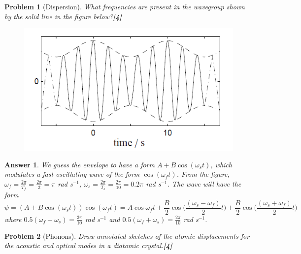\documentclass[a4paper]{article}
\newtheorem{ans}{Answer}[subsection]
\theoremstyle{new}
\newtheorem{qns}{Problem}[subsection]
\begin{document}
\begin{qns}[Dispersion]
What frequencies are present in the wavegroup shown by the solid line in the figure below?\hfill\textbf{[4]}
\begin{figure}[H]
    \centering
    \includegraphics[scale=0.7]{2012P2A3Q.PNG}
\end{figure}
\end{qns}
\begin{ans}
We guess the envelope to have a form $A+B\cos(\omega_st)$, which modulates a fast oscillating wave of the form $\cos(\omega_ft)$. From the figure, $\omega_f=\frac{2\pi}{T_f}=\frac{2\pi}{2}=\pi$ rad s$^{-1}$, $\omega_s=\frac{2\pi}{T_s}=\frac{2\pi}{10}=0.2\pi$ rad s$^{-1}$. The wave will have the form
$$\psi=(A+B\cos(\omega_st))\cos(\omega_ft)=A\cos\omega_ft+\frac{B}{2}\cos\bigg(\frac{(\omega_s-\omega_f)}{2}t\bigg)+\frac{B}{2}\cos\bigg(\frac{(\omega_s+\omega_f)}{2}t\bigg)$$
where $0.5(\omega_f-\omega_s)=\frac{3\pi}{10}$ rad s$^{-1}$ and $0.5(\omega_f+\omega_s)=\frac{2\pi}{10}$ rad s$^{-1}$.
\end{ans}
\begin{qns}[Phonons]
Draw annotated sketches of the atomic displacements for the acoustic and optical modes in a diatomic crystal.\hfill\textbf{[4]}
\end{qns}
\end{document}
